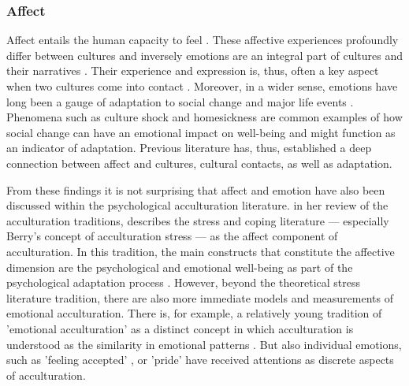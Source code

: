 \documentclass[man, 12pt, a4paper]{apa7}
\begin{document}
\subsubsection{Affect}
Affect entails the human capacity to feel \citep[including emotions and moods;][]{FeldmanBarrett2007}. These affective experiences profoundly differ between cultures \citep[e.g.,][]{Holodynski2012, Boiger2018} and inversely emotions are an integral part of cultures and their narratives \citep{Ahmed2014, Kitayama1994, Smith2016c, Sundararajan2015}. Their experience and expression is, thus, often a key aspect when two cultures come into contact \citep[e.g.,][]{Iyer2008, Stephan1992}. Moreover, in a wider sense, emotions have long been a gauge of adaptation to social change and major life events \citep[e.g.,][]{Smith1990, Pacella2017}. Phenomena such as culture shock \citep{Ward2001a} and homesickness \citep{VanTilburg1996} are common examples of how social change can have an emotional impact on well-being and might function as an indicator of adaptation. Previous literature has, thus, established a deep connection between affect and cultures, cultural contacts, as well as adaptation.

From these findings it is not surprising that affect and emotion have also been discussed within the psychological acculturation literature. \citet{Ward2001} in her review of the acculturation traditions, describes the stress and coping literature --- especially Berry's concept of acculturation stress \citep{Berry1997b} --- as the affect component of acculturation. In this tradition, the main constructs that constitute the affective dimension are the psychological and emotional well-being as part of the psychological adaptation process \citep[including, for example life satisfaction and depression][]{Ward2019}. However, beyond the theoretical stress literature tradition, there are also more immediate models and measurements of emotional acculturation. There is, for example, a relatively young tradition of 'emotional acculturation' as a distinct concept in which acculturation is understood as the similarity in emotional patterns \citep[see][for a review]{DeLeersnyder2017}. But also individual emotions, such as 'feeling accepted' \citep{Jasini2018}, or 'pride' \citep{Suinn1995} have received attentions as discrete aspects of acculturation. 
\end{document}
